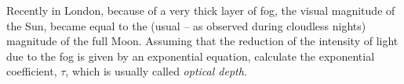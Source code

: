 Recently in London, because of a very thick layer of fog, the visual
magnitude of the Sun, became equal to the (usual -- as observed during
cloudless nights) magnitude of the full Moon. Assuming that the reduction of
the intensity of light due to the fog is given by an exponential equation,
calculate the exponential coefficient, $\tau$, which is usually called
\emph{optical depth}.
